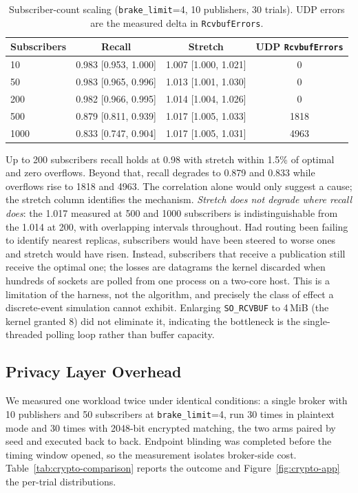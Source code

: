 \documentclass[10pt]{article}
\begin{document}
\begin{table}[t]
\centering
\caption{Subscriber-count scaling (\texttt{brake\_limit}=4, 10 publishers, 30 trials). UDP errors are the measured delta in \texttt{RcvbufErrors}.}
\label{tab:scale}
\begin{tabular}{lccc}
\toprule
Subscribers & Recall & Stretch & UDP \texttt{RcvbufErrors} \\
\midrule
10   & 0.983 [0.953, 1.000] & 1.007 [1.000, 1.021] & 0 \\
50   & 0.983 [0.965, 0.996] & 1.013 [1.001, 1.030] & 0 \\
200  & 0.982 [0.966, 0.995] & 1.014 [1.004, 1.026] & 0 \\
500  & 0.879 [0.811, 0.939] & 1.017 [1.005, 1.033] & 1818 \\
1000 & 0.833 [0.747, 0.904] & 1.017 [1.005, 1.031] & 4963 \\
\bottomrule
\end{tabular}
\end{table}

Up to 200 subscribers recall holds at 0.98 with stretch within 1.5\% of optimal and zero overflows. Beyond that, recall degrades to 0.879 and 0.833 while overflows rise to 1818 and 4963. The correlation alone would only suggest a cause; the stretch column identifies the mechanism. \emph{Stretch does not degrade where recall does}: the 1.017 measured at 500 and 1000 subscribers is indistinguishable from the 1.014 at 200, with overlapping intervals throughout. Had routing been failing to identify nearest replicas, subscribers would have been steered to worse ones and stretch would have risen. Instead, subscribers that receive a publication still receive the optimal one; the losses are datagrams the kernel discarded when hundreds of sockets are polled from one process on a two-core host. This is a limitation of the harness, not the algorithm, and precisely the class of effect a discrete-event simulation cannot exhibit. Enlarging \texttt{SO\_RCVBUF} to 4\,MiB (the kernel granted 8) did not eliminate it, indicating the bottleneck is the single-threaded polling loop rather than buffer capacity.

\subsection{Privacy Layer Overhead}
\label{sec:crypto}

We measured one workload twice under identical conditions: a single broker with 10 publishers and 50 subscribers at \texttt{brake\_limit}=4, run 30 times in plaintext mode and 30 times with 2048-bit encrypted matching, the two arms paired by seed and executed back to back. Endpoint blinding was completed before the timing window opened, so the measurement isolates broker-side cost. Table~\ref{tab:crypto-comparison} reports the outcome and Figure~\ref{fig:crypto-app} the per-trial distributions.
\end{document}
